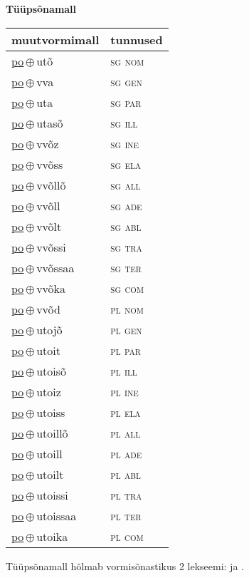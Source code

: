

\vspace{3.5em}
\noindent \begin{minipage}{\textwidth}
\noindent \textbf{Tüüpsõnamall \,}\\

\begin{sideways}
\begin{tabular}{l l}
muutvormimall & tunnused \\
\hline
\underline{po}\,$\oplus$\,utõ & \textsc{ sg nom } \\
\underline{po}\,$\oplus$\,vva & \textsc{ sg gen } \\
\underline{po}\,$\oplus$\,uta & \textsc{ sg par } \\
\underline{po}\,$\oplus$\,utasõ & \textsc{ sg ill } \\
\underline{po}\,$\oplus$\,vvõz & \textsc{ sg ine } \\
\underline{po}\,$\oplus$\,vvõss & \textsc{ sg ela } \\
\underline{po}\,$\oplus$\,vvõllõ & \textsc{ sg all } \\
\underline{po}\,$\oplus$\,vvõll & \textsc{ sg ade } \\
\underline{po}\,$\oplus$\,vvõlt & \textsc{ sg abl } \\
\underline{po}\,$\oplus$\,vvõssi & \textsc{ sg tra } \\
\underline{po}\,$\oplus$\,vvõssaa & \textsc{ sg ter } \\
\underline{po}\,$\oplus$\,vvõka & \textsc{ sg com } \\
\underline{po}\,$\oplus$\,vvõd & \textsc{ pl nom } \\
\underline{po}\,$\oplus$\,utojõ & \textsc{ pl gen } \\
\underline{po}\,$\oplus$\,utoit & \textsc{ pl par } \\
\underline{po}\,$\oplus$\,utoisõ & \textsc{ pl ill } \\
\underline{po}\,$\oplus$\,utoiz & \textsc{ pl ine } \\
\underline{po}\,$\oplus$\,utoiss & \textsc{ pl ela } \\
\underline{po}\,$\oplus$\,utoillõ & \textsc{ pl all } \\
\underline{po}\,$\oplus$\,utoill & \textsc{ pl ade } \\
\underline{po}\,$\oplus$\,utoilt & \textsc{ pl abl } \\
\underline{po}\,$\oplus$\,utoissi & \textsc{ pl tra } \\
\underline{po}\,$\oplus$\,utoissaa & \textsc{ pl ter } \\
\underline{po}\,$\oplus$\,utoika & \textsc{ pl com } \\
\end{tabular}
\end{sideways}
\label{tab:tüüpsõnamall-poutõ}

\end{minipage}

 
\vspace{1em}
\noindent Tüüpsõnamall  hõlmab vormisõnastikus 2 lekseemi:  ja .
